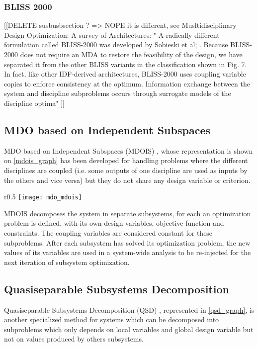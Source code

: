 \subsubsection{BLISS 2000}
[[DELETE susbusbsection ? => NOPE it is different, see Musltidisciplinary Design Optimization: A survey of Architectures:
"    A radically different formulation called BLISS-2000 was developed by Sobieski et al; . Because BLISS-2000
does not require an MDA to restore the feasibility of the design, we have separated it from the other BLISS variants
in the classification shown in Fig. 7. In fact, like other IDF-derived architectures, BLISS-2000 uses coupling variable
copies to enforce consistency at the optimum. Information exchange between the system and discipline subproblems
occurs through surrogate models of the discipline optima"
]]
   
\subsection{MDO based on Independent Subspaces}

MDO based on Independent Subspaces (MDOIS) \cite{NME:NME1380}, whose representation is shown on \figurename{} \ref{mdois_graph} has been developed for handling problems where the different disciplines are coupled (i.e. some outputs of one discipline are used as inputs by the others and vice versa) but they do not share any design variable or criterion.

\begin{wrapfigure}{r}{0.5\textwidth}
\centering
\texttt{[image: mdo\_mdois]}
\caption{MDOIS method}\label{mdois_graph}
\end{wrapfigure}

MDOIS decomposes the system in separate subsystems, for each an optimization problem is defined, with its own design variables, objective-function and constraints. The coupling variables are considered constant for these subproblems. After each subsystem has solved its optimization problem, the new values of its variables are used in a system-wide analysis to be re-injected for the next iteration of subsystem optimization.

\subsection{Quasiseparable Subsystems Decomposition}

Quasiseparable Subsystems Decomposition (QSD) \cite{1389-4420}, represented in \figurename{} \ref{qsd_graph}, is another specialized method for systems which can be decomposed into subproblems which only depends on local variables and global design variable but not on values produced by others subsystems.

